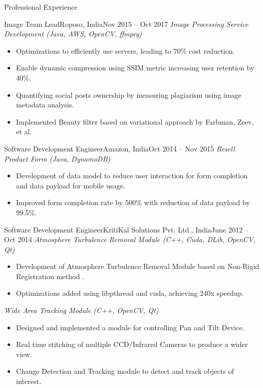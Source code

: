 \documentclass[]{mcdowellcv}
\begin{document}
\begin{cvsection}{Professional Experience}
        \begin{cvsubsection}{Image Team Lead}{Roposo, India}{Nov 2015 -- Oct 2017}        
        \textit{Image Processing Service Development (Java, AWS, OpenCV, ffmpeg)}
            \begin{itemize}
                \item Optimizations to efficiently use servers, leading to 70\% cost reduction.
                \item Enable dynamic compression using SSIM metric increasing user retention by 40\%.
                \item Quantifying social posts ownership by measuring plagiarism using image metadata analysis.
                \item Implemented Beauty filter based on variational approach by Farbman, Zeev, et al. \cite{farbman2008edge}
            \end{itemize}
        \end{cvsubsection}
          
        \begin{cvsubsection}{Software Development Engineer}{Amazon, India}{Oct 2014 -- Nov 2015}        
        \textit{Resell Product Form (Java, DynamoDB)}
            \begin{itemize}
                \item Development of data model to reduce user interaction for form completion and data payload for mobile usage.
                \item Improved form completion rate by 500\% with reduction of data payload by 99.5\%.
            \end{itemize}
        \end{cvsubsection}

        \begin{cvsubsection}{Software Development Engineer}{KritiKal Solutions Pvt. Ltd., India}{June 2012 -- Oct 2014}
            \textit{Atmosphere Turbulence Removal Module (C++, Cuda, DLib, OpenCV, Qt)}
            \begin{itemize}
                \item Development of Atmosphere Turbulence Removal Module based on Non-Rigid Registration method \cite{rueckert1999nonrigid}.
                \item Optimizations added using libpthread and cuda, achieving 240x speedup.
            \end{itemize}
            
            \textit{Wide Area Tracking Module (C++, OpenCV, Qt)}
            \begin{itemize}
                \item Designed and implemented a module for controlling Pan and Tilt Device.
                \item Real time stitching of multiple CCD/Infrared Cameras to produce a wider view.
                \item Change Detection and Tracking module to detect and track objects of interest.
            \end{itemize}
        \end{cvsubsection}
    \end{cvsection}
    
\end{document}
